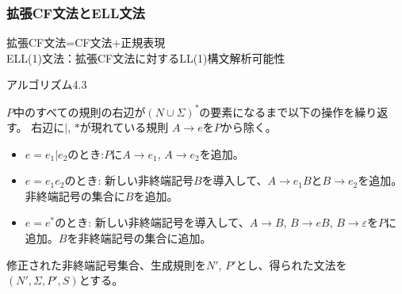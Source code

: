 \documentclass[dvipdfmx]{beamer}
\begin{document}
\begin{frame}
  \frametitle{拡張CF文法とELL文法}

  拡張CF文法=CF文法+正規表現\\
  ELL(1)文法：拡張CF文法に対するLL(1)構文解析可能性

  \vspace*{5pt}

  {\scriptsize
    \begin{itembox}[l]{アルゴリズム4.3}
      \begin{list}{}{}
        \item [(1)] $P$中のすべての規則の右辺が$(N\cup\Sigma)^\ast$の要素になるまで以下の操作を繰り返す。
              右辺に$\vert$, $\ast$が現れている規則 $A\rightarrow e$を$P$から除く。
              \begin{itemize}
                \item $e=e_1\vert e_2$のとき:$P$に$A\rightarrow e_1$, $A\rightarrow e_2$を追加。
                \item $e=e_1e_2$のとき: 新しい非終端記号$B$を導入して、$A\rightarrow e_1B$と$B\rightarrow e_2$を追加。
                      非終端記号の集合に$B$を追加。
                \item $e=e^\ast$のとき: 新しい非終端記号を導入して、$A\rightarrow B$, $B\rightarrow eB$, $B\rightarrow\varepsilon$を$P$に追加。$B$を非終端記号の集合に追加。
              \end{itemize}
        \item [(2)] 修正された非終端記号集合、生成規則を$N'$, $P'$とし、得られた文法を$(N',\Sigma,P',S)$とする。
      \end{list}
    \end{itembox}

  }
  \vspace*{10pt}
\end{frame}
\end{document}
